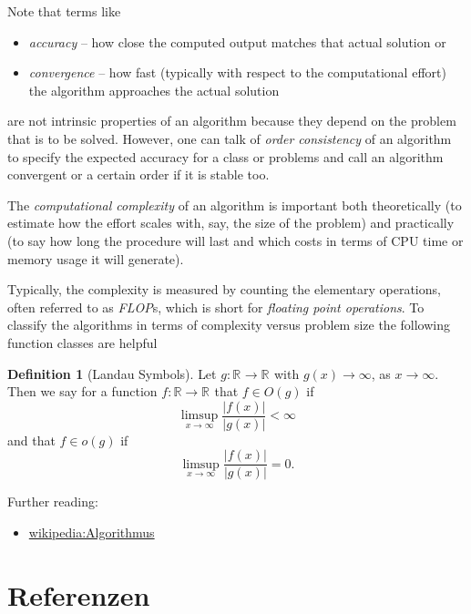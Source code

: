 \documentclass[
]{book}
\providecommand{\tightlist}{%
  \setlength{\itemsep}{0pt}\setlength{\parskip}{0pt}}
\theoremstyle{definition}
\newtheorem{definition}{Definition}[chapter]
\theoremstyle{definition}
\theoremstyle{definition}
\theoremstyle{definition}
\theoremstyle{remark}
\begin{document}
Note that terms like

\begin{itemize}
\tightlist
\item
  \emph{accuracy} -- how close the computed output matches that actual solution or
\item
  \emph{convergence} -- how fast (typically with respect to the computational effort) the algorithm approaches the actual solution
\end{itemize}

are not intrinsic properties of an algorithm because they depend on the problem that is to be solved.
However, one can talk of \emph{order consistency} of an algorithm to specify the expected accuracy for a class or problems and call an algorithm convergent or a certain order if it is stable too.

The \emph{computational complexity} of an algorithm is important both theoretically (to estimate how the effort scales with, say, the size of the problem) and practically (to say how long the procedure will last and which costs in terms of CPU time or memory usage it will generate).

Typically, the complexity is measured by counting the elementary operations, often referred to as \emph{FLOP}s, which is short for \emph{floating point operations}.
To classify the algorithms in terms of complexity versus problem size the following function classes are helpful

\begin{definition}[Landau Symbols]
\protect\hypertarget{def:landau-symbs}{}\label{def:landau-symbs}Let \(g\colon \mathbb R^{} \to \mathbb R^{}\) with \(g(x)\to \infty\), as \(x\to \infty\). Then we say for a function \(f\colon \mathbb R \to \mathbb R^{}\) that \(f\in O(g)\) if
\begin{equation*}
\limsup_{x\to \infty} \frac{|f(x)|}{|g(x)|} < \infty
\end{equation*}
and that \(f\in o(g)\) if
\begin{equation*}
\limsup_{x\to \infty} \frac{|f(x)|}{|g(x)|} = 0.
\end{equation*}
\end{definition}

Further reading:

\begin{itemize}
\tightlist
\item
  \href{https://de.wikipedia.org/wiki/Algorithmus\#Definition}{wikipedia:Algorithmus}
\end{itemize}

\hypertarget{referenzen}{%
\chapter*{Referenzen}\label{referenzen}}
\end{document}
